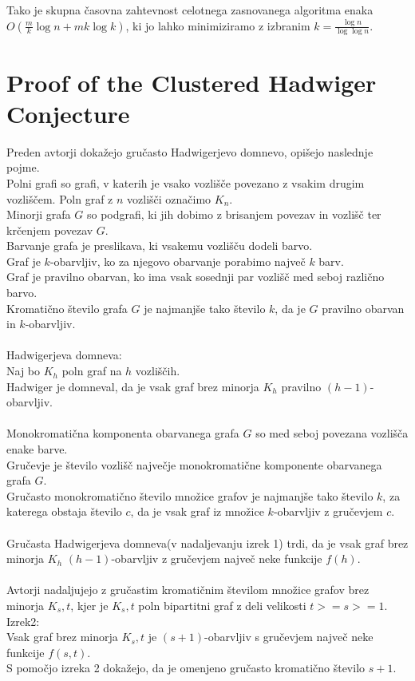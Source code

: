 \documentclass{article}
\begin{document}
Tako je skupna časovna zahtevnost celotnega zasnovanega algoritma enaka $O(\frac{m}{k}\log n + mk \log k)$, ki jo lahko minimiziramo z izbranim $k = \frac{\log n}{\log \log n}$.

\section{Proof of the Clustered Hadwiger Conjecture}
Preden avtorji dokažejo gručasto Hadwigerjevo domnevo, opišejo naslednje pojme.\\

Polni grafi so grafi, v katerih je vsako vozlišče povezano z vsakim drugim vozliščem. Poln graf z $n$ vozlišči označimo $K_n$.\\                                                           
Minorji grafa $G$ so podgrafi, ki jih dobimo z brisanjem povezav in vozlišč ter krčenjem povezav $G$.\\
Barvanje grafa je preslikava, ki vsakemu vozlišču dodeli barvo.\\
Graf je $k$-obarvljiv, ko za njegovo obarvanje porabimo največ $k$ barv.\\
Graf je pravilno obarvan, ko ima vsak sosednji par vozlišč med seboj različno barvo.\\
Kromatično število grafa $G$ je najmanjše tako število $k$, da je $G$ pravilno obarvan in $k$-obarvljiv.\\
\\
Hadwigerjeva domneva:\\
Naj bo $K_h$ poln graf na $h$ vozliščih.\\
Hadwiger je domneval, da je vsak graf brez minorja $K_h$ pravilno $(h - 1)$-obarvljiv.\\
\\
Monokromatična komponenta obarvanega grafa $G$ so med seboj povezana vozlišča enake barve.\\
Gručevje je število vozlišč največje monokromatične komponente obarvanega grafa $G$.\\
Gručasto monokromatično število množice grafov je najmanjše tako število $k$, za katerega obstaja število $c$, da je vsak graf iz množice $k$-obarvljiv z gručevjem $c$.\\
\\
Gručasta Hadwigerjeva domneva(v nadaljevanju izrek 1) trdi, da je vsak graf brez minorja $K_h$ $(h - 1)$-obarvljiv z gručevjem največ neke funkcije $f(h)$.\\
\\
Avtorji nadaljujejo z gručastim kromatičnim številom množice grafov brez minorja $K_s,t$, kjer je $K_s,t$ poln bipartitni graf z deli velikosti $t>=s>=1$.\\
Izrek2:\\
Vsak graf brez minorja $K_s,t$ je $(s+1)$-obarvljiv s gručevjem največ neke funkcije $f(s,t)$.\\
S pomočjo izreka 2 dokažejo, da je omenjeno gručasto kromatično število $s+1$.\\
\end{document}
